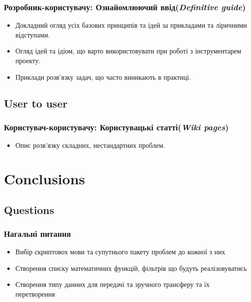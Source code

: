 \documentclass[final,12pt,aspectratio=43]{beamer}
\begin{document}
\begin{frame}
    \frametitle{Розробник-користувачу: Ознайомлюючий ввід({\it Definitive guide})}
    \begin{itemize}
        \item Докладний огляд усіх базових принципів та ідей за прикладами та ліричними відступами.
        \item Огляд ідей та ідіом, що варто використовувати при роботі з інструментарем проекту.
        \item Приклади розв’язку задач, що часто виникають в практиці.
    \end{itemize}
\end{frame}

\subsection{User to user}
\begin{frame}
    \frametitle{Користувач-користувачу: Користувацькі статті({\it Wiki pages})}
    \begin{itemize}
        \item Опис розв’язку складних, нестандартних проблем.
    \end{itemize}
\end{frame}

\section{Conclusions}
\subsection{Questions}
\begin{frame}
    \frametitle{Нагальні питання}
    \begin{itemize}
        \item Вибір скриптовох мови та супутнього пакету проблем до кожної з них
        \item Створення списку математичних функцій, фільтрів що будуть реалізовуватись
        \item Створення типу данних для передачі та зручного трансферу та їх перетворення
    \end{itemize}
\end{frame}
\end{document}
